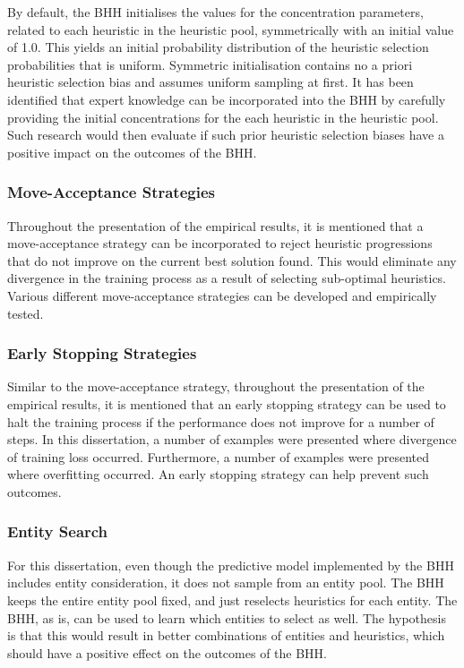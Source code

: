 By default, the \acs{BHH} initialises the values for the concentration parameters, related to each heuristic in the heuristic pool, symmetrically with an initial value of 1.0. This yields an initial probability distribution of the heuristic selection probabilities that is uniform. Symmetric initialisation contains no a priori heuristic selection bias and assumes uniform sampling at first. It has been identified that expert knowledge can be incorporated into the \acs{BHH} by carefully providing the initial concentrations for the each heuristic in the heuristic pool. Such research would then evaluate if such prior heuristic selection biases have a positive impact on the outcomes of the \acs{BHH}.

\subsubsection{Move-Acceptance Strategies}
\label{sec:conclusion:further_research:move_acceptance}

Throughout the presentation of the empirical results, it is mentioned that a move-acceptance strategy can be incorporated to reject heuristic progressions that do not improve on the current best solution found. This would eliminate any divergence in the training process as a result of selecting sub-optimal heuristics. Various different move-acceptance strategies can be developed and empirically tested.

\subsubsection{Early Stopping Strategies}
\label{sec:conclusion:further_research:early_stopping}

Similar to the move-acceptance strategy, throughout the presentation of the empirical results, it is mentioned that an early stopping strategy can be used to halt the training process if the performance does not improve for a number of steps. In this dissertation, a number of examples were presented where divergence of training loss occurred. Furthermore, a number of examples were presented where overfitting occurred. An early stopping strategy can help prevent such outcomes.

\subsubsection{Entity Search}
\label{sec:conclusion:further_research:entity_search}
For this dissertation, even though the predictive model implemented by the \acs{BHH} includes entity consideration, it does not sample from an entity pool. The \acs{BHH} keeps the entire entity pool fixed, and just reselects heuristics for each entity. The \acs{BHH}, as is, can be used to learn which entities to select as well. The hypothesis is that this would result in better combinations of entities and heuristics, which should have a positive effect on the outcomes of the \acs{BHH}.

